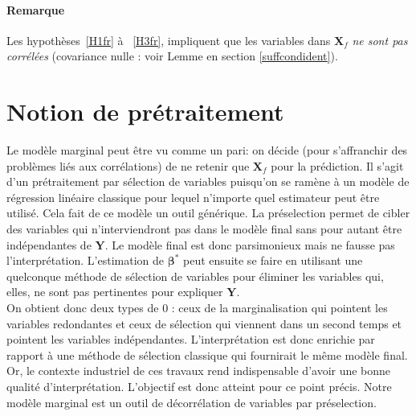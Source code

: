 \documentclass[12pt,a4paper]{report}
\begin{document}
		\paragraph{Remarque}
Les hypothèses~\ref{H1fr}  à ~\ref{H3fr}, impliquent que les variables dans $\boldsymbol{X}_f$ {\it ne sont pas corrélées} (covariance nulle : voir Lemme en section \ref{suffcondident}).
	\section{Notion de prétraitement}
	Le modèle marginal peut être vu comme un pari: on décide (pour s'affranchir des problèmes liés aux corrélations) de ne retenir que $\boldsymbol{X}_f$ pour la prédiction.
	Il s'agit d'un prétraitement par sélection de variables puisqu'on se ramène à un modèle de régression linéaire classique pour lequel n'importe quel estimateur peut être utilisé. Cela fait de ce modèle un outil générique. La préselection permet de cibler des variables qui n'interviendront pas dans le modèle final sans pour autant être indépendantes de $\boldsymbol{Y}$. Le modèle final est donc parsimonieux mais ne fausse pas l'interprétation. L'estimation de $\boldsymbol{\beta}^*$ peut ensuite se faire en utilisant une quelconque méthode de sélection de variables pour éliminer les variables qui, elles, ne sont pas pertinentes pour expliquer $\boldsymbol{Y}$.\\
	
	 On obtient donc deux types de 0 : ceux de la marginalisation qui pointent les variables redondantes et ceux de sélection qui viennent dans un second temps et pointent les variables indépendantes. L'interprétation est donc enrichie par rapport à une méthode de sélection classique qui fournirait le même modèle final. Or, le contexte industriel de ces travaux rend indispensable d'avoir une bonne qualité d'interprétation. L'objectif est donc atteint pour ce point précis. Notre modèle marginal est un outil de décorrélation de variables par préselection.
	 
\end{document}
